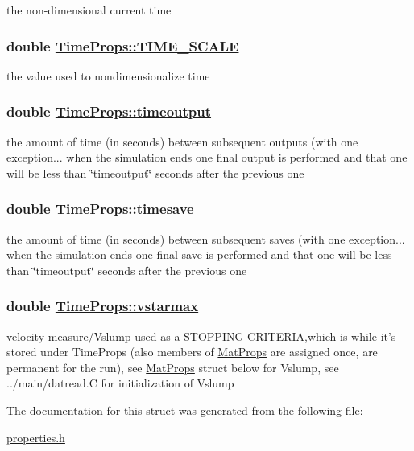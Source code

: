 the non-dimensional current time 

\hypertarget{structTimeProps_o10}{
\subsubsection[TIME\_\-SCALE]{\setlength{\rightskip}{0pt plus 5cm}double \hyperlink{structTimeProps_o10}{Time\-Props::TIME\_\-SCALE}}}
\label{structTimeProps_o10}


the value used to nondimensionalize time 

\hypertarget{structTimeProps_o4}{
\subsubsection[timeoutput]{\setlength{\rightskip}{0pt plus 5cm}double \hyperlink{structTimeProps_o4}{Time\-Props::timeoutput}}}
\label{structTimeProps_o4}


the amount of time (in seconds) between subsequent outputs (with one exception... when the simulation ends one final output is performed and that one will be less than \char`\"{}timeoutput\char`\"{} seconds after the previous one 

\hypertarget{structTimeProps_o5}{
\subsubsection[timesave]{\setlength{\rightskip}{0pt plus 5cm}double \hyperlink{structTimeProps_o5}{Time\-Props::timesave}}}
\label{structTimeProps_o5}


the amount of time (in seconds) between subsequent saves (with one exception... when the simulation ends one final save is performed and that one will be less than \char`\"{}timeoutput\char`\"{} seconds after the previous one 

\hypertarget{structTimeProps_o13}{
\subsubsection[vstarmax]{\setlength{\rightskip}{0pt plus 5cm}double \hyperlink{structTimeProps_o13}{Time\-Props::vstarmax}}}
\label{structTimeProps_o13}


velocity measure/Vslump used as a STOPPING CRITERIA,which is while it's stored under Time\-Props (also members of \hyperlink{structMatProps}{Mat\-Props} are assigned once, are permanent for the run), see \hyperlink{structMatProps}{Mat\-Props} struct below for Vslump, see ../main/datread.C for initialization of Vslump 



The documentation for this struct was generated from the following file:\begin{CompactItemize}
\item 
\hyperlink{properties_8h}{properties.h}\end{CompactItemize}
